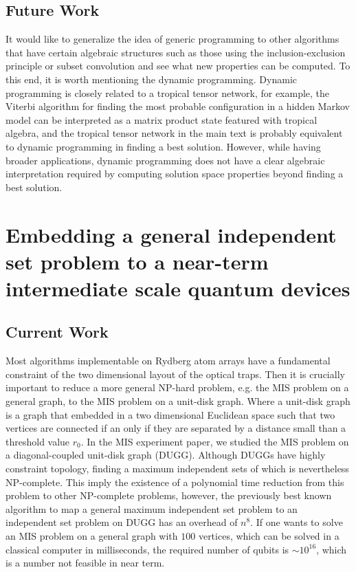 \documentclass[a4paper]{article}
\newcommand{\<}{\langle}
\renewcommand{\>}{\rangle}
\begin{document}
\subsection{Future Work}
It would like to generalize the idea of generic programming to other algorithms that have certain algebraic structures such as those using the inclusion-exclusion principle or subset convolution and see what new properties can be computed.
To this end, it is worth mentioning the dynamic programming.
Dynamic programming is closely related to a tropical tensor network, for example, the Viterbi algorithm for finding the most probable configuration in a hidden Markov model can be interpreted as a matrix product state featured with tropical algebra, and the tropical tensor network in the main text is probably equivalent to dynamic programming in finding a best solution.
However, while having broader applications,
dynamic programming does not have a clear algebraic interpretation required by computing solution space properties beyond finding a best solution.

\section{Embedding a general independent set problem to a near-term intermediate scale quantum devices}
\subsection{Current Work}

Most algorithms implementable on Rydberg atom arrays have a fundamental constraint of the two dimensional layout of the optical traps.
Then it is crucially important to reduce a more general NP-hard problem, e.g. the MIS problem on a general graph, to the MIS problem on a unit-disk graph. Where a unit-disk graph is a graph that embedded in a two dimensional Euclidean space such that two vertices are connected if an only if they are separated by a distance small than a threshold value $r_0$.
In the MIS experiment paper, we studied the MIS problem on a diagonal-coupled unit-disk graph (DUGG).
Although DUGGs have highly constraint topology, finding a maximum independent sets of which is nevertheless NP-complete.
This imply the existence of a polynomial time reduction from this problem to other NP-complete problems, however, the previously best known algorithm to map a general maximum independent set problem to an independent set problem on DUGG has an overhead of $n^8$.
If one wants to solve an MIS problem on a general graph with $100$ vertices, which can be solved in a classical computer in milliseconds, the required number of qubits is $\sim10^{16}$, which is a number not feasible in near term.
\end{document}
